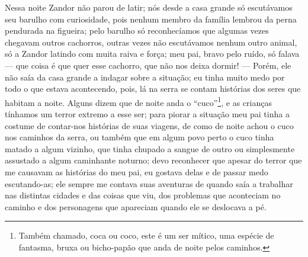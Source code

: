 Nessa noite Zandor não parou de latir; nós desde a casa grande só escutávamos seu barulho com curiosidade, pois nenhum membro da família lembrou da perna pendurada na figueira; pelo barulho só reconhecíamos que algumas vezes chegavam outros cachorros, outras vezes não escutávamos nenhum outro animal, só a Zandor latindo com muita raiva e força; meu pai, bravo pelo ruído, só falava --- que coisa é que quer esse cachorro, que não nos deixa dormir! --- Porém, ele não saía da casa grande a indagar sobre a situação; eu tinha muito medo por todo o que estava acontecendo, pois, lá na serra se contam histórias dos seres que habitam a noite. 
Alguns dizem que de noite anda o ``cuco''\footnote{Também chamado, coca ou coco, este é um ser mítico, uma espécie de fantasma, bruxa ou bicho-papão que anda de noite pelos caminhos.}, e as crianças tínhamos um terror extremo a esse ser; para piorar a situação meu pai tinha a costume de contar-nos histórias de suas viagens, de como de noite achou o cuco nos caminhos da serra, ou também que em algum povo perto o cuco tinha matado a algum vizinho, que tinha chupado a sangue de outro ou simplesmente assustado a algum caminhante noturno; devo reconhecer que apesar do terror que me causavam as histórias do meu pai, eu gostava delas e de passar medo escutando-as; ele sempre me contava suas aventuras de quando saía a trabalhar nas distintas cidades e das coisas que viu, dos problemas que aconteciam no caminho e dos personagens que apareciam quando ele se deslocava a pé.

